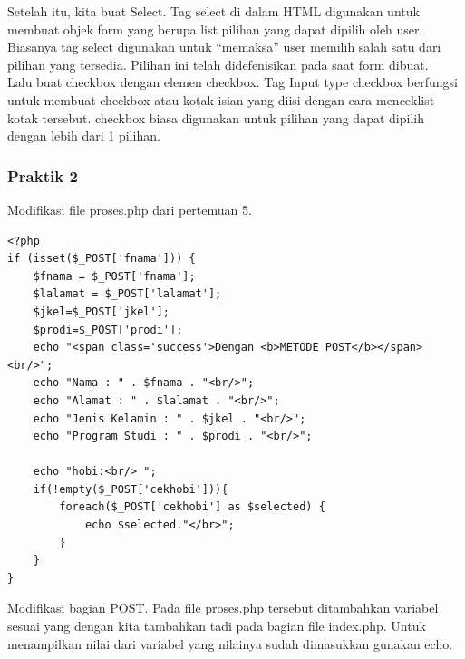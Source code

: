 \documentclass[a4paper,12pt]{article}
\begin{document}
Setelah itu, kita buat Select. Tag select di dalam HTML digunakan untuk membuat objek form yang berupa list
pilihan yang dapat dipilih oleh user. Biasanya tag select digunakan untuk “memaksa”
user memilih salah satu dari pilihan yang tersedia. Pilihan ini telah didefenisikan pada
saat form dibuat.\\

Lalu buat checkbox dengan elemen checkbox. Tag Input type checkbox berfungsi untuk membuat checkbox atau kotak isian yang
diisi dengan cara menceklist kotak tersebut. checkbox biasa digunakan untuk pilihan
yang dapat dipilih dengan lebih dari 1 pilihan.

\subsubsection{Praktik 2}
Modifikasi file proses.php dari pertemuan 5.
\begin{lstlisting}[style=PHP]
<?php
if (isset($_POST['fnama'])) {
    $fnama = $_POST['fnama'];
    $lalamat = $_POST['lalamat'];
    $jkel=$_POST['jkel'];
    $prodi=$_POST['prodi'];
    echo "<span class='success'>Dengan <b>METODE POST</b></span><br/>";
    echo "Nama : " . $fnama . "<br/>";
    echo "Alamat : " . $lalamat . "<br/>";
    echo "Jenis Kelamin : " . $jkel . "<br/>";
    echo "Program Studi : " . $prodi . "<br/>";

    echo "hobi:<br/> ";
    if(!empty($_POST['cekhobi'])){
        foreach($_POST['cekhobi'] as $selected) {
            echo $selected."</br>";
        }
    }
}
\end{lstlisting}
Modifikasi bagian POST. Pada file proses.php tersebut ditambahkan variabel sesuai yang dengan kita tambahkan tadi pada
bagian file index.php. Untuk menampilkan nilai dari variabel yang nilainya sudah dimasukkan gunakan echo.
\end{document}
